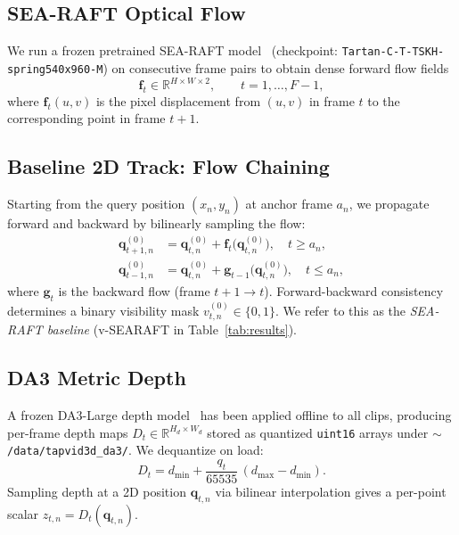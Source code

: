 \documentclass[11pt,a4paper]{article}
\begin{document}
\subsection{SEA-RAFT Optical Flow}

We run a frozen pretrained SEA-RAFT model~\cite{searaft}
(checkpoint: \texttt{Tartan-C-T-TSKH-spring540x960-M}) on consecutive
frame pairs to obtain dense forward flow fields
\begin{equation}
  \bm{f}_t \in \mathbb{R}^{H \times W \times 2}, \qquad t = 1, \dots, F-1,
\end{equation}
where $\bm{f}_t(u, v)$ is the pixel displacement from $(u, v)$ in
frame $t$ to the corresponding point in frame $t+1$.

\subsection{Baseline 2D Track: Flow Chaining}

Starting from the query position $(x_n, y_n)$ at anchor frame $a_n$,
we propagate forward and backward by bilinearly sampling the flow:
\begin{align}
  \bm{q}_{t+1, n}^{(0)} &= \bm{q}_{t,n}^{(0)} +
    \bm{f}_t\bigl(\bm{q}_{t,n}^{(0)}\bigr), \quad t \geq a_n, \\
  \bm{q}_{t-1, n}^{(0)} &= \bm{q}_{t,n}^{(0)} +
    \bm{g}_{t-1}\bigl(\bm{q}_{t,n}^{(0)}\bigr), \quad t \leq a_n,
\end{align}
where $\bm{g}_t$ is the backward flow (frame $t+1 \to t$). Forward-backward
consistency determines a binary visibility mask $v_{t,n}^{(0)} \in \{0, 1\}$.
We refer to this as the \emph{SEA-RAFT baseline} (v-SEARAFT in
Table~\ref{tab:results}).

\subsection{DA3 Metric Depth}

A frozen DA3-Large depth model~\cite{da3} has been applied
offline to all clips, producing per-frame depth maps
$D_t \in \mathbb{R}^{H_d \times W_d}$ stored as quantized
\texttt{uint16} arrays under \texttt{$\sim$/data/tapvid3d\_da3/}.
We dequantize on load:
\begin{equation}
  D_t = d_{\min} + \frac{q_t}{65535}\,(d_{\max} - d_{\min}).
\end{equation}
Sampling depth at a 2D position $\bm{q}_{t,n}$ via bilinear interpolation
gives a per-point scalar $z_{t,n} = D_t(\bm{q}_{t,n})$.
\end{document}
